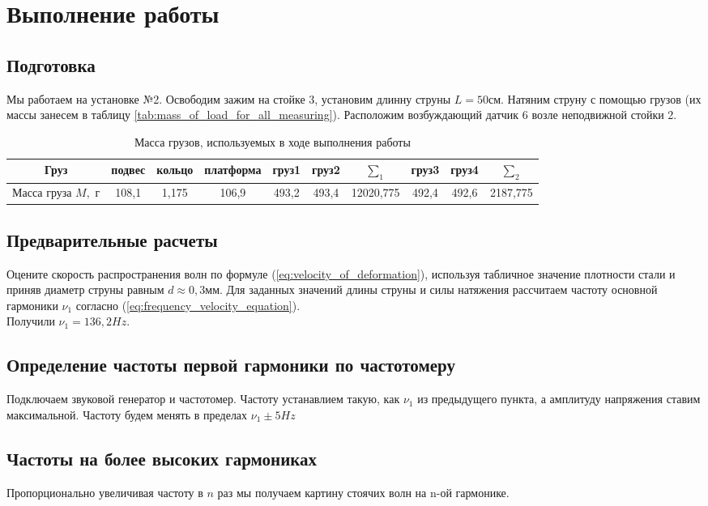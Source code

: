 \documentclass[13pt,a4paper]{article}
\begin{document}
\section{Выполнение работы}


\subsection{Подготовка}
Мы работаем на установке №2. Освободим зажим на стойке 3, установим длинну струны $L=50$см. Натяним струну с помощью грузов (их массы занесем в таблицу \ref{tab:mass_of_load_for_all_measuring}). Расположим возбуждающий датчик 6 возле неподвижной стойки 2.

\begin{table}[h!]
\centering
\begin{tabular}{|c|c|c|c|c|c|c|c|c|c|}
\hline
Груз    & подвес   & кольцо     & платформа     & груз1     & груз2  & $\sum_{1}$  & груз3     & груз4   & $\sum_{2}$  \\ \hline
Масса груза $M,$ г & 108,1 & 1,175 & 106,9 & 493,2 & 493,4 &  12020,775 & 492,4 & 492,6 & 2187,775 \\ \hline
\end{tabular}
\caption{Масса грузов, используемых в ходе выполнения работы}
\label{tab:mass_of_load}
\end{table}


\subsection{Предварительные расчеты}
Оцените скорость распространения волн по формуле (\ref{eq:velocity_of_deformation}), используя табличное значение плотности стали и приняв диаметр струны равным $d\approx0,3$мм. Для заданных значений длины струны и силы натяжения рассчитаем частоту основной гармоники $\nu_{1}$ согласно (\ref{eq:frequency_velocity_equation}).\\
Получили $\nu_{1}=136,2 Hz$.


\subsection{Определение частоты первой гармоники по частотомеру}
Подключаем звуковой генератор и частотомер. Частоту устанавлием такую, как $\nu_{1}$ из предыдущего пункта, а амплитуду напряжения ставим максимальной. Частоту будем менять в пределах $\nu_{1}\pm5 Hz$


\subsection{Частоты на более высоких гармониках}
Пропорционально увеличивая частоту в $n$ раз мы получаем картину стоячих волн на n-ой гармонике.
\end{document}
